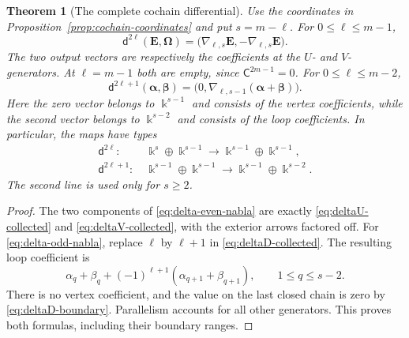 \documentclass[a4paper,11pt,oneside,reqno]{amsart}
\newtheorem{theorem}{Theorem}[section]
\theoremstyle{definition}
\numberwithin{equation}{section}
\begin{document}
	\begin{theorem}[The complete cochain differential]\label{thm:delta-nabla}
		Use the coordinates in Proposition~\ref{prop:cochain-coordinates} and
		put $s=m-\ell$.
		For $0\leq\ell\leq m-1$,
		\begin{equation}\label{eq:delta-even-nabla}
			\boxed{\mathsf d^{2\ell}(\mathbf E,\boldsymbol\Omega)
				=\bigl(\nabla_{\ell,s}\mathbf E,
				-\nabla_{\ell,s}\mathbf E\bigr).}
		\end{equation}
		The two output vectors are respectively the coefficients at the
		$U$- and $V$-generators.  At $\ell=m-1$ both are empty, since
		$\mathsf C^{2m-1}=0$.
		For $0\leq\ell\leq m-2$,
		\begin{equation}\label{eq:delta-odd-nabla}
			\boxed{\mathsf d^{2\ell+1}(\boldsymbol\alpha,\boldsymbol\beta)
				=\bigl(0,\nabla_{\ell,s-1}
				(\boldsymbol\alpha+\boldsymbol\beta)\bigr).}
		\end{equation}
		Here the zero vector belongs to $\Bbbk^{s-1}$ and consists of the vertex
		coefficients, while the second vector belongs to $\Bbbk^{s-2}$ and consists
		of the loop coefficients.  In particular, the maps have types
		\begin{equation}\label{eq:delta-types}
			\begin{aligned}
				\mathsf d^{2\ell}:&\ \Bbbk^s\oplus \Bbbk^{s-1}
				\longrightarrow \Bbbk^{s-1}\oplus \Bbbk^{s-1},\\
				\mathsf d^{2\ell+1}:&\ \Bbbk^{s-1}\oplus \Bbbk^{s-1}
				\longrightarrow \Bbbk^{s-1}\oplus \Bbbk^{s-2}.
			\end{aligned}
		\end{equation}
		The second line is used only for $s\geq2$.
	\end{theorem}
	
	\begin{proof}
		The two components of \eqref{eq:delta-even-nabla} are exactly
		\eqref{eq:deltaU-collected} and \eqref{eq:deltaV-collected}, with the
		exterior arrows factored off.  For \eqref{eq:delta-odd-nabla}, replace
		$\ell$ by $\ell+1$ in \eqref{eq:deltaD-collected}.  The resulting loop
		coefficient is
		\[
		\alpha_q+\beta_q
		+(-1)^{\ell+1}(\alpha_{q+1}+\beta_{q+1}),
		\qquad 1\leq q\leq s-2.
		\]
		There is no vertex coefficient, and the value on the last closed chain
		is zero by \eqref{eq:deltaD-boundary}.  Parallelism accounts for all
		other generators.  This proves both formulas, including their boundary
		ranges.
	\end{proof}
	
\end{document}
